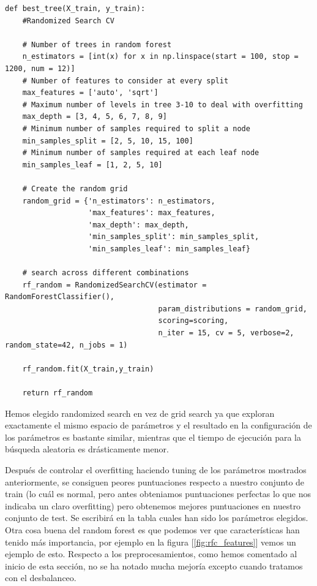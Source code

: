 \documentclass[12pt,twoside]{report}
\begin{document}
\begin{lstlisting}
def best_tree(X_train, y_train):
    #Randomized Search CV

    # Number of trees in random forest
    n_estimators = [int(x) for x in np.linspace(start = 100, stop = 1200, num = 12)]
    # Number of features to consider at every split
    max_features = ['auto', 'sqrt']
    # Maximum number of levels in tree 3-10 to deal with overfitting
    max_depth = [3, 4, 5, 6, 7, 8, 9]
    # Minimum number of samples required to split a node
    min_samples_split = [2, 5, 10, 15, 100]
    # Minimum number of samples required at each leaf node
    min_samples_leaf = [1, 2, 5, 10]
    
    # Create the random grid
    random_grid = {'n_estimators': n_estimators,
                   'max_features': max_features,
                   'max_depth': max_depth,
                   'min_samples_split': min_samples_split,
                   'min_samples_leaf': min_samples_leaf}
    
    # search across different combinations
    rf_random = RandomizedSearchCV(estimator = RandomForestClassifier(), 
                                   param_distributions = random_grid, 
                                   scoring=scoring, 
                                   n_iter = 15, cv = 5, verbose=2, random_state=42, n_jobs = 1)
    
    rf_random.fit(X_train,y_train)
    
    return rf_random
\end{lstlisting}

Hemos elegido randomized search en vez de grid search ya que exploran exactamente el mismo espacio de parámetros y el resultado en la configuración de los parámetros es bastante similar, mientras que el tiempo de ejecución para la búsqueda aleatoria es drásticamente menor. \cite{random-grid}

Después de controlar el overfitting haciendo tuning de los parámetros mostrados anteriormente, se consiguen peores puntuaciones respecto a nuestro conjunto de train (lo cuál es normal, pero antes obteniamos puntuaciones perfectas lo que nos indicaba un claro overfitting) pero obtenemos mejores puntuaciones en nuestro conjunto de test. Se escribirá en la tabla cuales han sido los parámetros elegidos. Otra cosa buena del random forest es que podemos ver que características han tenido más importancia, por ejemplo en la figura [\ref{fig:rfc_features}] vemos un ejemplo de esto. Respecto a los preprocesamientos, como hemos comentado al inicio de esta sección, no se ha notado mucha mejoría excepto cuando tratamos con el desbalanceo.
\end{document}
